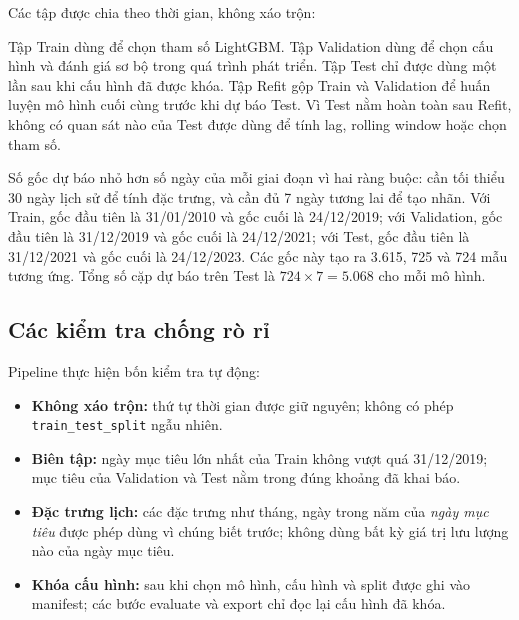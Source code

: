 Các tập được chia theo thời gian, không xáo trộn:

\begin{table}[H]
\centering
\small

\caption{Các tập huấn luyện, validation, refit và test.}
\label{tab:split}
\end{table}

Tập Train dùng để chọn tham số LightGBM. Tập Validation dùng để chọn cấu hình và
đánh giá sơ bộ trong quá trình phát triển. Tập Test chỉ được dùng một lần sau khi
cấu hình đã được khóa. Tập Refit gộp Train và Validation để huấn luyện mô hình cuối
cùng trước khi dự báo Test. Vì Test nằm hoàn toàn sau Refit, không có quan sát nào
của Test được dùng để tính lag, rolling window hoặc chọn tham số.

Số gốc dự báo nhỏ hơn số ngày của mỗi giai đoạn vì hai ràng buộc: cần tối thiểu 30
ngày lịch sử để tính đặc trưng, và cần đủ 7 ngày tương lai để tạo nhãn. Với Train,
gốc đầu tiên là 31/01/2010 và gốc cuối là 24/12/2019; với Validation, gốc đầu tiên
là 31/12/2019 và gốc cuối là 24/12/2021; với Test, gốc đầu tiên là 31/12/2021 và
gốc cuối là 24/12/2023. Các gốc này tạo ra 3.615, 725 và 724 mẫu tương ứng. Tổng
số cặp dự báo trên Test là $724 \times 7 = 5.068$ cho mỗi mô hình.

\subsection{Các kiểm tra chống rò rỉ}

Pipeline thực hiện bốn kiểm tra tự động:

\begin{itemize}[leftmargin=1.4em]
  \item \textbf{Không xáo trộn:} thứ tự thời gian được giữ nguyên; không có phép
  \texttt{train\_test\_\allowbreak split} ngẫu nhiên.
  \item \textbf{Biên tập:} ngày mục tiêu lớn nhất của Train không vượt quá
  31/12/2019; mục tiêu của Validation và Test nằm trong đúng khoảng đã khai báo.
  \item \textbf{Đặc trưng lịch:} các đặc trưng như tháng, ngày trong năm của
  \emph{ngày mục tiêu} được phép dùng vì chúng biết trước; không dùng bất kỳ giá trị
  lưu lượng nào của ngày mục tiêu.
  \item \textbf{Khóa cấu hình:} sau khi chọn mô hình, cấu hình và split được ghi
  vào manifest; các bước evaluate và export chỉ đọc lại cấu hình đã khóa.
\end{itemize}

